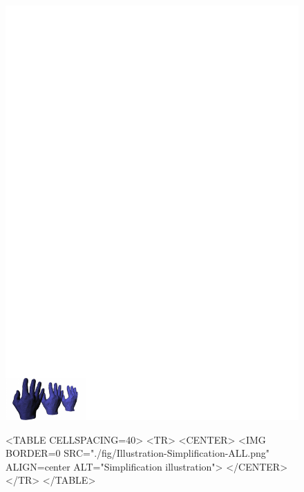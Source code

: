 




\begin{figure}[htbp]
\begin{ccTexOnly}
\begin{center}
\includegraphics[width=17cm]{Surface_mesh_simplification/fig/Illustration-Simplification-ALL} %
\end{center}
\end{ccTexOnly}
\begin{ccHtmlOnly}
<TABLE CELLSPACING=40>
<TR>
<CENTER>
<IMG BORDER=0 SRC="./fig/Illustration-Simplification-ALL.png" ALIGN=center ALT="Simplification illustration">
</CENTER>
</TR>
</TABLE>
\end{ccHtmlOnly}
\end{figure}

